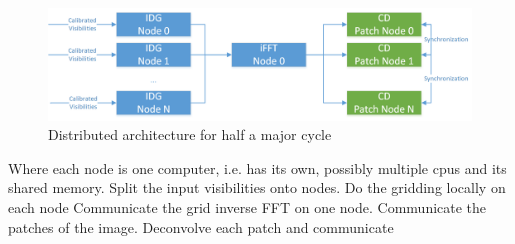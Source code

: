 \begin{figure}[h]
	\centering
	\includegraphics[width=0.80\linewidth]{./chapters/03.distribution/distributed_architecture.png}
	\caption{Distributed architecture for half a major cycle}
	\label{dist:architecture:fig}
\end{figure}

Where each node is one computer, i.e. has its own, possibly multiple cpus and its shared memory.
Split the input visibilities onto nodes. 
Do the gridding locally on each node
Communicate the grid
inverse FFT on one node.
Communicate the patches of the image.
Deconvolve each patch and communicate
